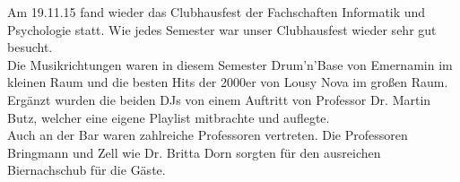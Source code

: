Am 19.11.15 fand wieder das Clubhausfest der Fachschaften Informatik und Psychologie statt. Wie jedes Semester war unser Clubhausfest wieder sehr gut besucht.\\
Die Musikrichtungen waren in diesem Semester Drum'n'Base von Emernamin im kleinen Raum und die besten Hits der 2000er von Lousy Nova im großen Raum. Ergänzt wurden die beiden DJs von einem Auftritt von Professor Dr. Martin Butz, welcher eine eigene Playlist mitbrachte und auflegte.\\
Auch an der Bar waren zahlreiche Professoren vertreten. Die Professoren Bringmann und Zell wie Dr. Britta Dorn sorgten für den ausreichen Biernachschub für die Gäste.
